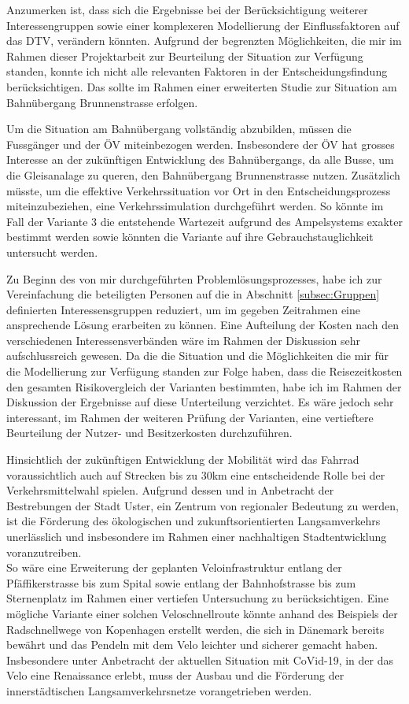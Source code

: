 Anzumerken ist, dass sich die Ergebnisse bei der Berücksichtigung weiterer Interessengruppen sowie einer komplexeren Modellierung der Einflussfaktoren auf das DTV, verändern könnten. Aufgrund der begrenzten Möglichkeiten, die mir im Rahmen dieser Projektarbeit zur Beurteilung der Situation zur Verfügung standen, konnte ich nicht alle relevanten Faktoren in der Entscheidungsfindung berücksichtigen. Das sollte im Rahmen einer erweiterten Studie zur Situation am Bahnübergang Brunnenstrasse erfolgen.

Um die Situation am Bahnübergang vollständig abzubilden, müssen die Fussgänger und der ÖV miteinbezogen werden. Insbesondere der ÖV hat grosses Interesse an der zukünftigen Entwicklung des Bahnübergangs, da alle Busse, um die Gleisanalage zu queren, den Bahnübergang Brunnenstrasse nutzen. Zusätzlich müsste, um die effektive Verkehrssituation vor Ort in den Entscheidungsprozess miteinzubeziehen, eine Verkehrssimulation durchgeführt werden. So könnte im Fall der Variante 3 die entstehende Wartezeit aufgrund des Ampelsystems exakter bestimmt werden sowie könnten die Variante auf ihre Gebrauchstauglichkeit untersucht werden. 

Zu Beginn des von mir durchgeführten Problemlösungsprozesses, habe ich zur Vereinfachung die beteiligten Personen auf die in Abschnitt \ref{subsec:Gruppen} definierten Interessensgruppen reduziert, um im gegeben Zeitrahmen eine ansprechende Lösung erarbeiten zu können. 
Eine Aufteilung der Kosten nach den verschiedenen Interessensverbänden wäre im Rahmen der Diskussion sehr aufschlussreich gewesen. Da die die Situation und die Möglichkeiten die mir für die Modellierung zur Verfügung standen zur Folge haben, dass die Reisezeitkosten den gesamten Risikovergleich der Varianten bestimmten, habe ich im Rahmen der Diskussion der Ergebnisse auf diese Unterteilung verzichtet. Es wäre jedoch sehr interessant, im Rahmen der weiteren Prüfung der Varianten, eine vertieftere Beurteilung der Nutzer- und Besitzerkosten durchzuführen.

Hinsichtlich der zukünftigen Entwicklung der Mobilität wird das Fahrrad voraussichtlich auch auf Strecken bis zu 30km eine entscheidende Rolle bei der Verkehrsmittelwahl spielen. Aufgrund dessen und in Anbetracht der Bestrebungen der Stadt Uster, ein Zentrum von regionaler Bedeutung zu werden, ist die Förderung des ökologischen und zukunftsorientierten Langsamverkehrs unerlässlich und insbesondere im Rahmen einer nachhaltigen Stadtentwicklung voranzutreiben. \\
So wäre eine Erweiterung der geplanten Veloinfrastruktur entlang der Pfäffikerstrasse bis zum Spital sowie entlang der Bahnhofstrasse bis zum Sternenplatz im Rahmen einer vertiefen Untersuchung zu berücksichtigen. Eine mögliche Variante einer solchen Veloschnellroute könnte anhand des Beispiels der Radschnellwege von Kopenhagen erstellt werden, die sich in Dänemark bereits bewährt und das Pendeln mit dem Velo leichter und sicherer gemacht haben.  \\
Insbesondere unter Anbetracht der aktuellen Situation mit CoVid-19, in der das Velo eine Renaissance erlebt, muss der Ausbau und die Förderung der innerstädtischen Langsamverkehrsnetze vorangetrieben werden.

